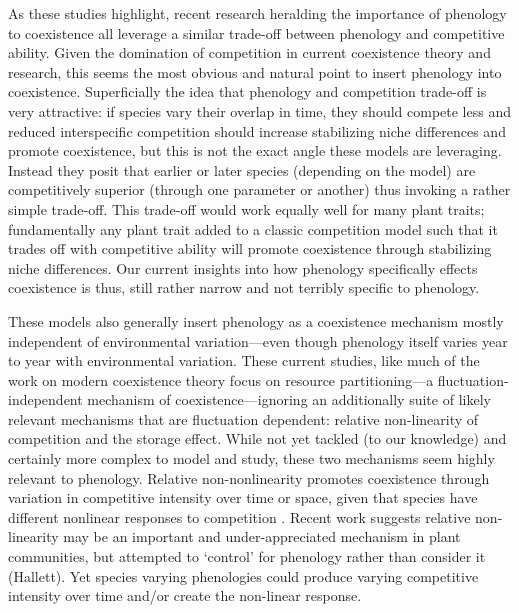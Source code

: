 \documentclass[11pt]{article}
\begin{document}
As these studies highlight, recent research heralding the importance of phenology to coexistence all leverage a similar trade-off between phenology and competitive ability. Given the domination of competition in current coexistence theory and research, this seems the most obvious and natural point to insert phenology into coexistence. Superficially the idea that phenology and competition trade-off is very attractive: if species vary their overlap in time, they should compete less and reduced interspecific competition should increase stabilizing niche differences and promote coexistence, but this is not the exact angle these models are leveraging. Instead they posit that earlier or later species (depending on the model) are competitively superior (through one parameter or another) thus invoking a rather simple trade-off. This trade-off would work equally well for many plant traits; fundamentally any plant trait added to a classic competition model such that it trades off with competitive ability will promote coexistence through stabilizing niche differences. Our current insights into how phenology specifically effects coexistence is thus, still rather narrow and not terribly specific to phenology. 

These models also generally insert phenology as a coexistence mechanism mostly independent of environmental variation---even though phenology itself varies year to year with environmental variation. These current studies, like much of the work on modern coexistence theory focus on resource partitioning---a fluctuation-independent mechanism of coexistence---ignoring an additionally suite of likely relevant mechanisms that are fluctuation dependent: relative non-linearity of competition and the storage effect. While not yet tackled (to our knowledge) and certainly more complex to model and study, these two mechanisms seem highly relevant to phenology. Relative non-nonlinearity promotes coexistence through variation in competitive intensity over time or space, given that species have different nonlinear responses to competition \citep{CHESSON:1994vn,Chesson:2000vd}. Recent work suggests relative non-linearity may be an important and under-appreciated mechanism in plant communities, but attempted to `control' for phenology rather than consider it (Hallett). Yet species varying phenologies could produce varying competitive intensity over time and/or create the non-linear response. 
\end{document}
